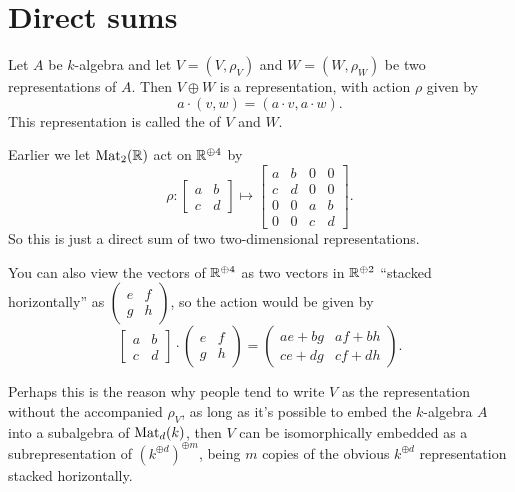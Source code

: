 \section{Direct sums}
\begin{definition}
	Let $A$ be $k$-algebra and let $V = (V, \rho_V)$ and $W = (W, \rho_W)$
	be two representations of $A$.
	Then $V \oplus W$ is a representation, with action $\rho$ given by
	\[ a \cdot (v,w) = (a \cdot v, a \cdot w). \]
	This representation is called the  of $V$ and $W$.
\end{definition}
\begin{example}
	\label{ex:mat2_representation}
	Earlier we let $\mathrm{Mat}_2(\mathbb R)$ act on $\mathbb R^{\oplus 4}$ by
	\[
		\rho :
		\begin{bmatrix} a & b \\ c & d \end{bmatrix}
		\mapsto
		\begin{bmatrix} a & b & 0 & 0 \\ c & d & 0 & 0 \\
			0 & 0 & a & b \\ 0 & 0 & c & d \end{bmatrix} .
	\]
	So this is just a direct sum of two two-dimensional representations.

	You can also view the vectors of $\mathbb R^{\oplus 4}$ as two vectors in
	$\mathbb R^{\oplus 2}$ ``stacked horizontally'' as
	$\begin{pmatrix}e&f \\ g&h\end{pmatrix}$,
	so the action would be given by
	\[
		\begin{bmatrix} a & b \\ c & d \end{bmatrix} \cdot
		\begin{pmatrix} e&f \\ g&h\end{pmatrix}
		= \begin{pmatrix} ae+bg&af+bh \\ ce+dg&cf+dh \end{pmatrix}.
	\]
\end{example}

\begin{remark}
	Perhaps this is the reason why people tend to write $V$ as the
	representation without the accompanied $\rho_V$, as long as it's possible to
	embed the $k$-algebra $A$ into a subalgebra of $\mathrm{Mat}_d(k)$, then $V$ can be
	isomorphically embedded as a subrepresentation of $(k^{\oplus d})^{\oplus
	m}$, being $m$ copies of the obvious $k^{\oplus d}$ representation stacked
	horizontally.
\end{remark}

